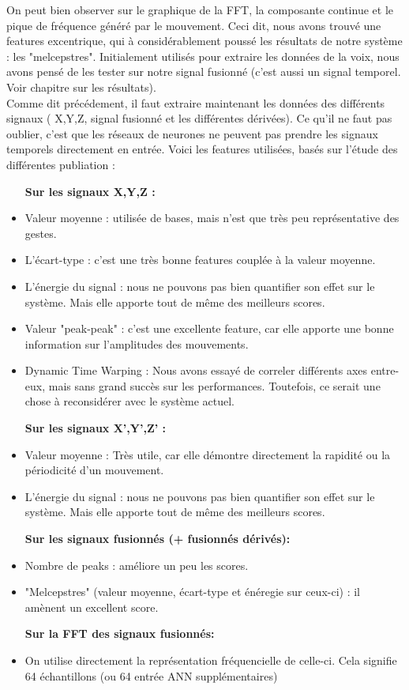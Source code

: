 On peut bien observer sur le graphique de la FFT, la composante continue et le pique de fréquence généré par le mouvement. Ceci dit, nous avons trouvé une features excentrique, qui à considérablement poussé les résultats de notre système : les "melcepstres". Initialement utilisés pour extraire les données de la voix, nous avons pensé de les tester sur notre signal fusionné (c'est aussi un signal temporel. Voir chapitre sur les résultats).\\

Comme dit précédement, il faut extraire maintenant les données des différents signaux ( X,Y,Z, signal fusionné et les différentes dérivées). Ce qu'il ne faut pas oublier, c'est que les réseaux de neurones ne peuvent pas prendre les signaux temporels directement en entrée. Voici les features utilisées, basés sur l'étude des différentes publiation :
\begin{itemize}
\item[\textbf{Sur les signaux X,Y,Z :}]
\item Valeur moyenne : utilisée de bases, mais n'est que très peu représentative des gestes.
\item L'écart-type : c'est une très bonne features couplée à la valeur moyenne.
\item L'énergie du signal : nous ne pouvons pas bien quantifier son effet sur le système. Mais elle apporte tout de même des meilleurs scores.
\item Valeur "peak-peak" : c'est une excellente feature, car elle apporte une bonne information sur l'amplitudes des mouvements.
\item Dynamic Time Warping : Nous avons essayé de correler différents axes entre-eux, mais sans grand succès sur les performances. Toutefois, ce serait une chose à reconsidérer avec le système actuel.\pagebreak

\item[\textbf{Sur les signaux X',Y',Z' :}]
\item Valeur moyenne : Très utile, car elle démontre directement la rapidité ou la périodicité d'un mouvement.
\item L'énergie du signal : nous ne pouvons pas bien quantifier son effet sur le système. Mais elle apporte tout de même des meilleurs scores.\\

\item[\textbf{Sur les signaux fusionnés (+ fusionnés dérivés):}]
\item Nombre de peaks : améliore un peu les scores.
\item "Melcepstres" (valeur moyenne, écart-type et énéregie sur ceux-ci) : il amènent un excellent score. 

\item[\textbf{Sur la FFT des signaux fusionnés:}]
\item On utilise directement la représentation fréquencielle de celle-ci. Cela signifie 64 échantillons (ou 64 entrée ANN supplémentaires)
\end{itemize}

